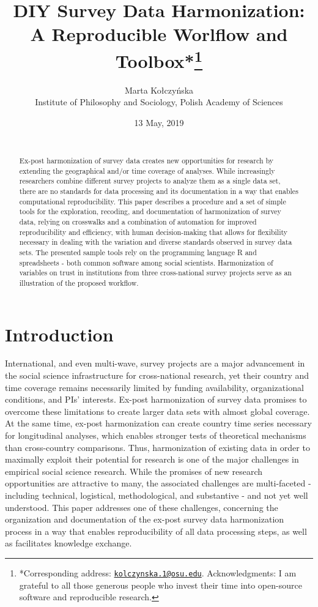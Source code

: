 \documentclass[12pt,]{article}
\title{\vspace{1cm}DIY Survey Data Harmonization: A Reproducible Worlflow and Toolbox*\footnote{*Corresponding address: \href{mailto:kolczynska.1@osu.edu}{\nolinkurl{kolczynska.1@osu.edu}}. Acknowledgments: I am grateful to all those generous people who invest their time into open-source software and reproducible research.}\vspace{0.5cm}\\}
\author{Marta Kołczyńska\\
Institute of Philosophy and Sociology, Polish Academy of Sciences}
\date{13 May, 2019\\
~\\}
\begin{document}
\maketitle
\begin{abstract}
\noindent{}Ex-post harmonization of survey data creates new opportunities for research by extending the geographical and/or time coverage of analyses. While increasingly researchers combine different survey projects to analyze them as a single data set, there are no standards for data processing and its documentation in a way that enables computational reproducibility. This paper describes a procedure and a set of simple tools for the exploration, recoding, and documentation of harmonization of survey data, relying on crosswalks and a combination of automation for improved reproducibility and efficiency, with human decision-making that allows for flexibility necessary in dealing with the variation and diverse standards observed in survey data sets. The presented sample tools rely on the programming language R and spreadsheets - both common software among social scientists. Harmonization of variables on trust in institutions from three cross-national survey projects serve as an illustration of the proposed workflow.\vspace{.8cm}
\end{abstract}

\clearpage

\renewcommand{\baselinestretch}{0.5}\normalsize
\tableofcontents
\renewcommand{\baselinestretch}{1.5}\normalsize

\clearpage

\parindent 0.5in

\hypertarget{introduction}{%
\section{Introduction}\label{introduction}}

International, and even multi-wave, survey projects are a major advancement in the social science infrastructure for cross-national research, yet their country and time coverage remains necessarily limited by funding availability, organizational conditions, and PIs' interests. Ex-post harmonization of survey data promises to overcome these limitations to create larger data sets with almost global coverage. At the same time, ex-post harmonization can create country time series necessary for longitudinal analyses, which enables stronger tests of theoretical mechanisms than cross-country comparisons. Thus, harmonization of existing data in order to maximally exploit their potential for research is one of the major challenges in empirical social science research. While the promises of new research opportunities are attractive to many, the associated challenges are multi-faceted - including technical, logistical, methodological, and substantive - and not yet well understood. This paper addresses one of these challenges, concerning the organization and documentation of the ex-post survey data harmonization process in a way that enables reproducibility of all data processing steps, as well as facilitates knowledge exchange.
\end{document}

